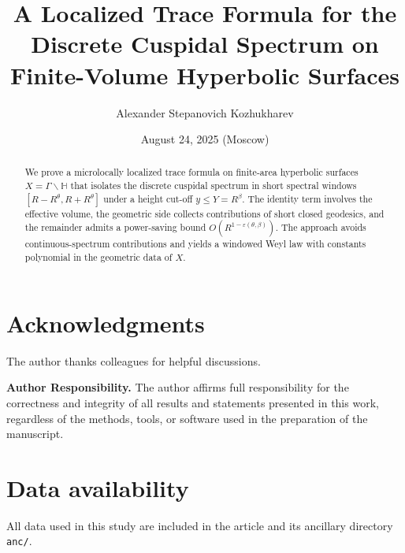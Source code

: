 \documentclass[12pt]{amsart}
\title[Localized Trace Formula]{A Localized Trace Formula for the Discrete Cuspidal Spectrum on Finite-Volume Hyperbolic Surfaces}
\author{Alexander Stepanovich Kozhukharev}
\date{August 24, 2025 (Moscow)}
\numberwithin{equation}{section}
\theoremstyle{plain}
\theoremstyle{definition}
\theoremstyle{remark}
\newcommand{\HH}{\mathbb{H}}
\begin{document}
\begin{abstract}
We prove a microlocally localized trace formula on finite-area hyperbolic surfaces $X=\Gamma\backslash\HH$ that isolates the discrete cuspidal spectrum in short spectral windows $[R-R^\theta,R+R^\theta]$ under a height cut-off $y\le Y=R^\beta$. The identity term involves the effective volume, the geometric side collects contributions of short closed geodesics, and the remainder admits a power-saving bound $O(R^{1-\varepsilon(\theta,\beta)})$. The approach avoids continuous-spectrum contributions and yields a windowed Weyl law with constants polynomial in the geometric data of $X$.
\end{abstract}

\maketitle
\tableofcontents










\section*{Acknowledgments}
The author thanks colleagues for helpful discussions.

\bigskip

\noindent\textbf{Author Responsibility.}
The author affirms full responsibility for the correctness and integrity of all results and statements presented in this work, regardless of the methods, tools, or software used in the preparation of the manuscript.

\section*{Data availability}
All data used in this study are included in the article and its ancillary directory \texttt{anc/}.

\appendix



\nocite{*}


\end{document}
